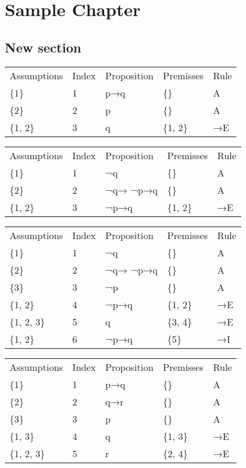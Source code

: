 \documentclass[a4paper,12pt]{book}
\begin{document}
	\chapter{Sample Chapter}
	\section{New section}

	
\begin{tabular}{lllll}
\toprule
Assumptions & Index & Proposition & Premisses & Rule \\
        \{1\} &     1 &         p→q &        \{\} &    A \\
\midrule
        \{2\} &     2 &           p &        \{\} &    A \\
     \{1, 2\} &     3 &           q &    \{1, 2\} &   →E \\
\bottomrule
\end{tabular}
\begin{tabular}{lllll}
\toprule
Assumptions & Index & Proposition & Premisses & Rule \\
        \{1\} &     1 &          ¬q &        \{\} &    A \\
\midrule
        \{2\} &     2 &    ¬q→ ¬p→q &        \{\} &    A \\
     \{1, 2\} &     3 &        ¬p→q &    \{1, 2\} &   →E \\
\bottomrule
\end{tabular}
\begin{tabular}{lllll}
\toprule
Assumptions & Index & Proposition & Premisses & Rule \\
        \{1\} &     1 &          ¬q &        \{\} &    A \\
\midrule
        \{2\} &     2 &    ¬q→ ¬p→q &        \{\} &    A \\
        \{3\} &     3 &          ¬p &        \{\} &    A \\
     \{1, 2\} &     4 &        ¬p→q &    \{1, 2\} &   →E \\
  \{1, 2, 3\} &     5 &           q &    \{3, 4\} &   →E \\
     \{1, 2\} &     6 &        ¬p→q &       \{5\} &   →I \\
\bottomrule
\end{tabular}
\begin{tabular}{lllll}
\toprule
Assumptions & Index & Proposition & Premisses & Rule \\
        \{1\} &     1 &         p→q &        \{\} &    A \\
\midrule
        \{2\} &     2 &         q→r &        \{\} &    A \\
        \{3\} &     3 &           p &        \{\} &    A \\
     \{1, 3\} &     4 &           q &    \{1, 3\} &   →E \\
  \{1, 2, 3\} &     5 &           r &    \{2, 4\} &   →E \\
\bottomrule
\end{tabular}
\end{document}
